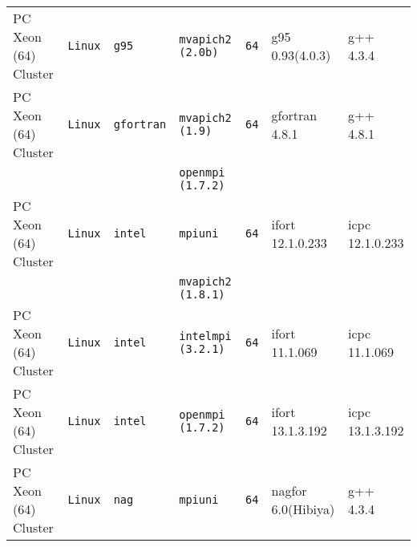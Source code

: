 \begin{longtable}{lllllll}
PC Xeon (64) Cluster  &\tt Linux  &\tt g95          &\tt mvapich2 (2.0b)  &\tt 64           & g95 \footnotesize 0.93(4.0.3)       & g++ \footnotesize 4.3.4         \\ %
PC Xeon (64) Cluster  &\tt Linux  &\tt gfortran     &\tt mvapich2 (1.9)   &\tt 64           & gfortran \footnotesize 4.8.1        & g++ \footnotesize 4.8.1         \\ %
                      &           &                 &\tt openmpi (1.7.2)  &                 &                                     &                                 \\
PC Xeon (64) Cluster  &\tt Linux  &\tt intel        &\tt mpiuni           &\tt 64           & ifort \footnotesize 12.1.0.233      & icpc \footnotesize 12.1.0.233   \\ %
                      &           &                 &\tt mvapich2 (1.8.1) &                 &                                     &                                 \\
PC Xeon (64) Cluster  &\tt Linux  &\tt intel        &\tt intelmpi (3.2.1) &\tt 64           & ifort \footnotesize 11.1.069        & icpc \footnotesize 11.1.069     \\ %
PC Xeon (64) Cluster  &\tt Linux  &\tt intel        &\tt openmpi (1.7.2)  &\tt 64           & ifort \footnotesize 13.1.3.192      & icpc \footnotesize 13.1.3.192   \\ %
PC Xeon (64) Cluster  &\tt Linux  &\tt nag          &\tt mpiuni           &\tt 64           & nagfor \footnotesize 6.0(Hibiya)    & g++  \footnotesize 4.3.4        \\ %

\end{longtable}
